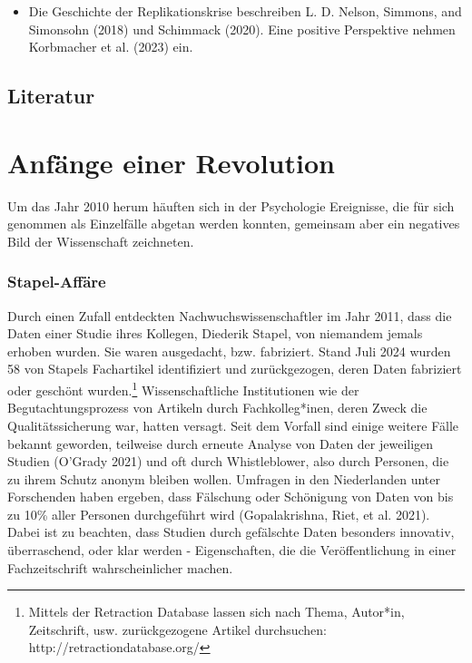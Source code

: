 \documentclass[
  letterpaper,
  DIV=11,
  numbers=noendperiod]{scrreprt}
\providecommand{\tightlist}{%
  \setlength{\itemsep}{0pt}\setlength{\parskip}{0pt}}\usepackage{longtable,booktabs,array}
\begin{document}

\begin{itemize}
\tightlist
\item
  Die Geschichte der Replikationskrise beschreiben L. D. Nelson,
  Simmons, and Simonsohn (2018) und Schimmack (2020). Eine positive
  Perspektive nehmen Korbmacher et al. (2023) ein.
\end{itemize}

\section*{Literatur}\label{literatur-3}


\chapter{Anfänge einer Revolution}\label{anfuxe4nge-einer-revolution}

Um das Jahr 2010 herum häuften sich in der Psychologie Ereignisse, die
für sich genommen als Einzelfälle abgetan werden konnten, gemeinsam aber
ein negatives Bild der Wissenschaft zeichneten.

\subsection{Stapel-Affäre}\label{stapel-affuxe4re}

Durch einen Zufall entdeckten Nachwuchswissenschaftler im Jahr 2011,
dass die Daten einer Studie ihres Kollegen, Diederik Stapel, von
niemandem jemals erhoben wurden. Sie waren ausgedacht, bzw. fabriziert.
Stand Juli 2024 wurden 58 von Stapels Fachartikel identifiziert und
zurückgezogen, deren Daten fabriziert oder geschönt wurden.\footnote{Mittels
  der Retraction Database lassen sich nach Thema, Autor*in, Zeitschrift,
  usw. zurückgezogene Artikel durchsuchen:
  http://retractiondatabase.org/} Wissenschaftliche Institutionen wie
der Begutachtungsprozess von Artikeln durch Fachkolleg*inen, deren Zweck
die Qualitätssicherung war, hatten versagt. Seit dem Vorfall sind einige
weitere Fälle bekannt geworden, teilweise durch erneute Analyse von
Daten der jeweiligen Studien (O'Grady 2021) und oft durch Whistleblower,
also durch Personen, die zu ihrem Schutz anonym bleiben wollen. Umfragen
in den Niederlanden unter Forschenden haben ergeben, dass Fälschung oder
Schönigung von Daten von bis zu 10\% aller Personen durchgeführt wird
(Gopalakrishna, Riet, et al. 2021). Dabei ist zu beachten, dass Studien
durch gefälschte Daten besonders innovativ, überraschend, oder klar
werden - Eigenschaften, die die Veröffentlichung in einer
Fachzeitschrift wahrscheinlicher machen.
\end{document}
